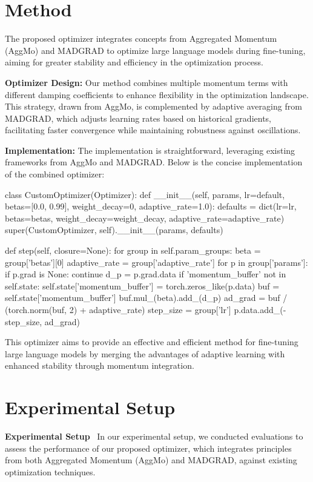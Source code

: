 \documentclass{article} %
\begin{document}
\section{Method}
\label{sec:method}
The proposed optimizer integrates concepts from Aggregated Momentum (AggMo) and MADGRAD to optimize large language models during fine-tuning, aiming for greater stability and efficiency in the optimization process.

\textbf{Optimizer Design:} Our method combines multiple momentum terms with different damping coefficients to enhance flexibility in the optimization landscape. This strategy, drawn from AggMo, is complemented by adaptive averaging from MADGRAD, which adjusts learning rates based on historical gradients, facilitating faster convergence while maintaining robustness against oscillations.

\textbf{Implementation:} The implementation is straightforward, leveraging existing frameworks from AggMo and MADGRAD. Below is the concise implementation of the combined optimizer:

class CustomOptimizer(Optimizer):
 def __init__(self, params, lr=default, betas=[0.0, 0.99], weight_decay=0, adaptive_rate=1.0):
  defaults = dict(lr=lr, betas=betas, weight_decay=weight_decay, adaptive_rate=adaptive_rate)
  super(CustomOptimizer, self).__init__(params, defaults)

 def step(self, closure=None):
  for group in self.param_groups:
   beta = group['betas'][0]
   adaptive_rate = group['adaptive_rate']
   for p in group['params']:
    if p.grad is None:
     continue
    d_p = p.grad.data
    if 'momentum_buffer' not in self.state:
     self.state['momentum_buffer'] = torch.zeros_like(p.data)
    buf = self.state['momentum_buffer']
    buf.mul_(beta).add_(d_p)
    ad_grad = buf / (torch.norm(buf, 2) + adaptive_rate)
    step_size = group['lr']
    p.data.add_(-step_size, ad_grad)

This optimizer aims to provide an effective and efficient method for fine-tuning large language models by merging the advantages of adaptive learning with enhanced stability through momentum integration.

\section{Experimental Setup}
\label{sec:experimental}
\textbf{Experimental Setup} \
In our experimental setup, we conducted evaluations to assess the performance of our proposed optimizer, which integrates principles from both Aggregated Momentum (AggMo) and MADGRAD, against existing optimization techniques.
\end{document}
